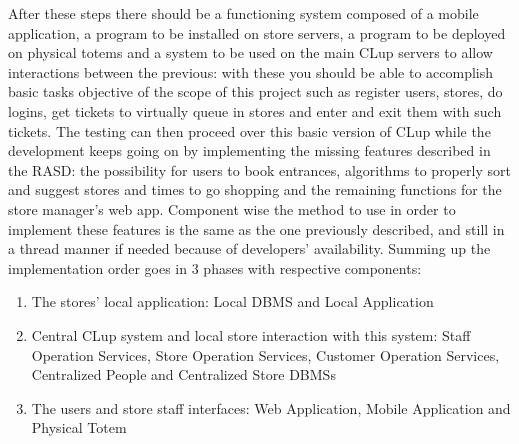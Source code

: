 After these steps there should be a functioning system composed of a mobile application, a program to be installed on store servers, a program to be deployed on physical totems and a system to be used on the main CLup servers to allow interactions between the previous: with these you should be able to accomplish basic tasks objective of the scope of this project such as register users, stores, do logins, get tickets to virtually queue in stores and enter and exit them with such tickets. The testing can then proceed over this basic version of CLup while the development keeps going on by implementing the missing features described in the RASD: the possibility for users to book entrances, algorithms to properly sort and suggest stores and times to go shopping and the remaining functions for the store manager’s web app.
Component wise the method to use in order to implement these features is the same as the one previously described, and still in a thread manner if needed because of developers’ availability.
Summing up the implementation order goes in 3 phases with respective components: \begin{enumerate}
	\item The stores’ local application: Local DBMS and Local Application
	\item Central CLup system and local store interaction with this system: Staff Operation Services, Store Operation Services, Customer Operation Services, Centralized People and Centralized Store DBMSs
	\item The users and store staff interfaces: Web Application, Mobile Application and Physical Totem
\end{enumerate}




